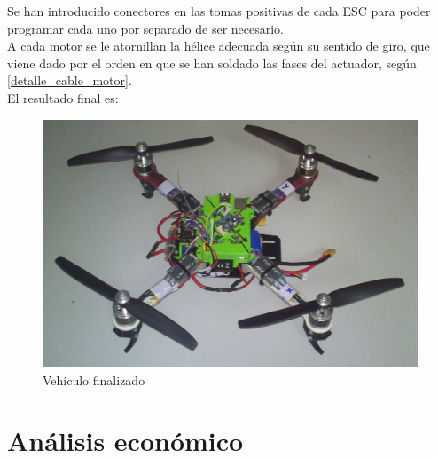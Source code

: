 \documentclass[twoside,11pt]{book}
\begin{document}
Se han introducido conectores en las tomas positivas de cada ESC para poder programar cada uno por separado de ser necesario. \\

A cada motor se le atornillan la hélice adecuada según su sentido de giro, que viene dado por el orden en que se han soldado las fases del actuador, según \ref{detalle_cable_motor}.\\

El resultado final es:

\begin{figure}[h!]
\begin{center}
\includegraphics[scale=0.19,bb=0 0 1600 1200]{images/qc_final.png}
\caption{Vehículo finalizado}
\end{center}
\end{figure}


\newpage

\chapter{Análisis económico} \label{economics}
\end{document}
